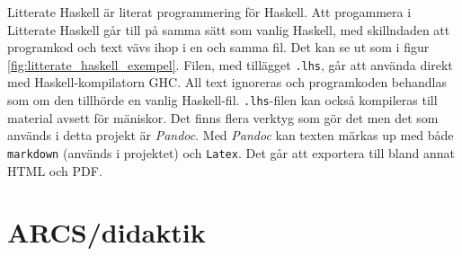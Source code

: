 Litterate Haskell är literat programmering för Haskell.\cite{litterate_haskell} Att progammera i Litterate Haskell går till på samma sätt som vanlig Haskell, med skillndaden att programkod och text vävs ihop i en och samma fil. Det kan se ut som i figur \ref{fig:litterate_haskell_exempel}. Filen, med tillägget \texttt{.lhs}, går att använda direkt med Haskell-kompilatorn GHC. All text ignoreras och programkoden behandlas som om den tillhörde en vanlig Haskell-fil. \texttt{.lhs}-filen kan också kompileras till material avsett för mäniskor. Det finns flera verktyg som gör det men det som används i detta projekt är \textit{Pandoc}\cite{pandoc}. Med \textit{Pandoc} kan texten märkas up med både \texttt{markdown} (används i projektet) och \texttt{Latex}. Det går att exportera till bland annat HTML och PDF.

\section{ARCS/didaktik}
\label{sec:arcs}